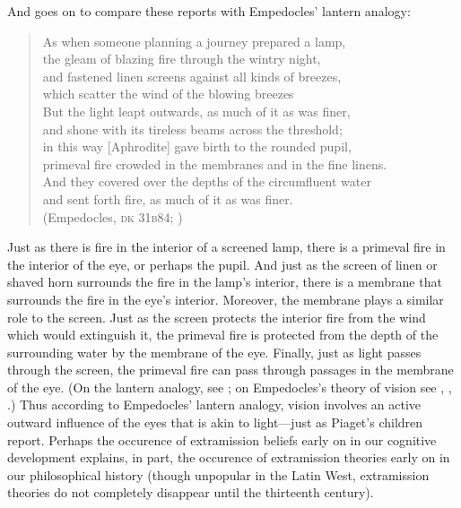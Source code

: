 And \citet[48--49]{Piaget:1929dp} goes on to compare these reports with Empedocles' lantern analogy:
\begin{verse}
	As when someone planning a journey prepared a lamp,\\
	the gleam of blazing fire through the wintry night,\\
	and fastened linen screens against all kinds of breezes,\\
	which scatter the wind of the blowing breezes\\
	But the light leapt outwards, as much of it as was finer,\\
	and shone with its tireless beams across the threshold;\\
	in this way [Aphrodite] gave birth to the rounded pupil,\\
	primeval fire crowded in the membranes and in the fine linens.\\
	And they covered over the depths of the circumfluent water\\
	and sent forth fire, as much of it as was finer.\\
	(Empedocles, \textsc{dk} 31\textsc{b}84; \citealt[103 259]{Inwood:2001ve})
\end{verse}
Just as there is fire in the interior of a screened lamp, there is a primeval fire in the interior of the eye, or perhaps the pupil. And just as the screen of linen or shaved horn surrounds the fire in the lamp's interior, there is a membrane that surrounds the fire in the eye's interior. Moreover, the membrane plays a similar role to the screen. Just as the screen protects the interior fire from the wind which would extinguish it, the primeval fire is protected from the depth of the surrounding water by the membrane of the eye. Finally, just as light passes through the screen, the primeval fire can pass through passages in the membrane of the eye. (On the lantern analogy, see \citealt[240--243]{Wright:1981zr}; on Empedocles's theory of vision see \citealt{Sedley:1992uq}, \citealt{Ierodiakonou:2005fk}, \citealt[chapter 1]{Kalderon:2015fr}.) Thus according to Empedocles' lantern analogy, vision involves an active outward influence of the eyes that is akin to light---just as Piaget's children report. Perhaps the occurence of extramission beliefs early on in our cognitive development explains, in part, the occurence of extramission theories early on in our philosophical history (though unpopular in the Latin West, extramission theories do not completely disappear until the thirteenth century). 

